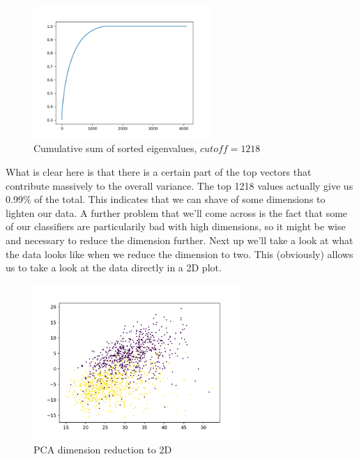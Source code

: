 \documentclass[12pt, a4paper]{article}
\begin{document}
\begin{figure}[H]
    \centering
    \includegraphics[width=0.6\textwidth]{recursos/1/cumsum_eigen_pca}
    \caption{Cumulative sum of sorted eigenvalues, $cutoff=1218$}
\end{figure}

What is clear here is that there is a certain part of the top vectors that contribute massively to the overall variance. The top 1218 values actually give us 0.99\% of the total. This indicates that we can shave of some dimensions to lighten our data. A further problem that we'll come across is the fact that some of our classifiers are particularily bad with high dimensions, so it might be wise and necessary to reduce the dimension further. Next up we'll take a look at what the data looks like when we reduce the dimension to two. This (obviously) allows us to take a look at the data directly in a 2D plot.

\begin{figure}[H]
    \centering
    \includegraphics[width=0.7\textwidth]{recursos/1/pca_2}
    \caption{PCA dimension reduction to 2D}
\end{figure}
\end{document}
